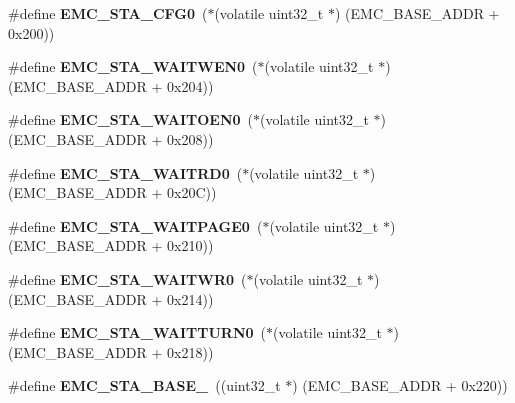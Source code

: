\begin{DoxyCompactItemize}
\mbox{\label{group__lpc24xx__regs_ga23681fc95a3888c5f3381d9bb4a5aad5}} 
\#define {\bfseries E\+M\+C\+\_\+\+S\+T\+A\+\_\+\+C\+F\+G0}~($\ast$(volatile uint32\+\_\+t $\ast$) (E\+M\+C\+\_\+\+B\+A\+S\+E\+\_\+\+A\+D\+DR + 0x200))
\item 
\mbox{\label{group__lpc24xx__regs_ga1ddeddff0b6a9c83b821b8baf69b3ca8}} 
\#define {\bfseries E\+M\+C\+\_\+\+S\+T\+A\+\_\+\+W\+A\+I\+T\+W\+E\+N0}~($\ast$(volatile uint32\+\_\+t $\ast$) (E\+M\+C\+\_\+\+B\+A\+S\+E\+\_\+\+A\+D\+DR + 0x204))
\item 
\mbox{\label{group__lpc24xx__regs_ga9ed72e9e02298c132847c1bbc43afecf}} 
\#define {\bfseries E\+M\+C\+\_\+\+S\+T\+A\+\_\+\+W\+A\+I\+T\+O\+E\+N0}~($\ast$(volatile uint32\+\_\+t $\ast$) (E\+M\+C\+\_\+\+B\+A\+S\+E\+\_\+\+A\+D\+DR + 0x208))
\item 
\mbox{\label{group__lpc24xx__regs_gae27cb519a2ab23933ed175ab80ff1e5e}} 
\#define {\bfseries E\+M\+C\+\_\+\+S\+T\+A\+\_\+\+W\+A\+I\+T\+R\+D0}~($\ast$(volatile uint32\+\_\+t $\ast$) (E\+M\+C\+\_\+\+B\+A\+S\+E\+\_\+\+A\+D\+DR + 0x20\+C))
\item 
\mbox{\label{group__lpc24xx__regs_ga0c8b7999161fe96a7ae9a5e2d212a175}} 
\#define {\bfseries E\+M\+C\+\_\+\+S\+T\+A\+\_\+\+W\+A\+I\+T\+P\+A\+G\+E0}~($\ast$(volatile uint32\+\_\+t $\ast$) (E\+M\+C\+\_\+\+B\+A\+S\+E\+\_\+\+A\+D\+DR + 0x210))
\item 
\mbox{\label{group__lpc24xx__regs_gac82315156c8f7474fb21827cc6269962}} 
\#define {\bfseries E\+M\+C\+\_\+\+S\+T\+A\+\_\+\+W\+A\+I\+T\+W\+R0}~($\ast$(volatile uint32\+\_\+t $\ast$) (E\+M\+C\+\_\+\+B\+A\+S\+E\+\_\+\+A\+D\+DR + 0x214))
\item 
\mbox{\label{group__lpc24xx__regs_ga725242583d6225e1c94aa5f414de41b2}} 
\#define {\bfseries E\+M\+C\+\_\+\+S\+T\+A\+\_\+\+W\+A\+I\+T\+T\+U\+R\+N0}~($\ast$(volatile uint32\+\_\+t $\ast$) (E\+M\+C\+\_\+\+B\+A\+S\+E\+\_\+\+A\+D\+DR + 0x218))
\item 
\mbox{\label{group__lpc24xx__regs_ga268102193e670ec0a4911d5aced8606d}} 
\#define {\bfseries E\+M\+C\+\_\+\+S\+T\+A\+\_\+\+B\+A\+S\+E\+\_}~((uint32\+\_\+t $\ast$) (E\+M\+C\+\_\+\+B\+A\+S\+E\+\_\+\+A\+D\+DR + 0x220))

\end{DoxyCompactItemize}
